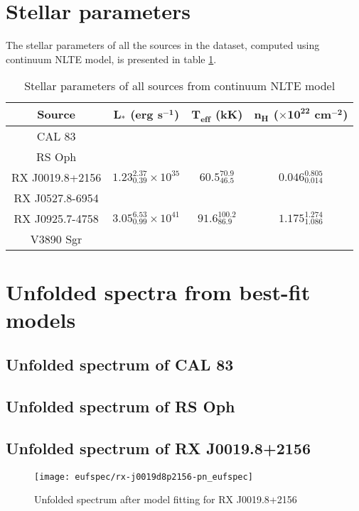 	\section{Stellar parameters}
		The stellar parameters of all the sources in the dataset, computed using continuum NLTE model, is presented in table \ref{tab:sss-stellar-params}.
		\renewcommand{\arraystretch}{1.8}
		\begin{table}[!htb]
			\centering
			\caption{Stellar parameters of all sources from continuum NLTE model}
			\label{tab:sss-stellar-params}
			\begin{tabular}{cccc}
			\hline
			{\textbf{Source}} & {$\boldsymbol{L_*}$ \textbf{(erg s$\boldsymbol{^{-1}}$)}} & {\textbf{$\boldsymbol{T_\text{eff}}$ (kK)}} & {\textbf{$\boldsymbol{n_H}$ ($\boldsymbol{\times 10^{22}}$ cm$\boldsymbol{^{-2}}$)}} \\
			\hline
			{CAL 83} & {} & {} & {} \\
			{RS Oph} & {} & {} & {} \\
			{RX J0019.8+2156} & {$1.23_{0.39}^{2.37}\times 10^{35}$} & {$60.5_{46.5}^{70.9}$} & {$0.046_{0.014}^{0.805}$} \\
			{RX J0527.8-6954} & {} & {} & {} \\
			{RX J0925.7-4758} & {$3.05_{0.99}^{6.53}\times 10^{41}$} & {$91.6_{86.9}^{100.2}$} & {$1.175_{1.086}^{1.274}$} \\
			{V3890 Sgr} & {} & {} & {} \\
			\hline
			\end{tabular}
		\end{table}
		\renewcommand{\arraystretch}{2.2}
	
	\section{Unfolded spectra from best-fit models}
	
		\subsection{Unfolded spectrum of CAL 83}
		
		\subsection{Unfolded spectrum of RS Oph}
		
		\subsection{Unfolded spectrum of RX J0019.8+2156}
			\begin{figure}[h!]
				\centering
				\texttt{[image: eufspec/rx-j0019d8p2156-pn\_eufspec]}
				\caption{Unfolded spectrum after model fitting for RX J0019.8+2156}
				\label{result:euf-rx-j0019}
			\end{figure}
		

